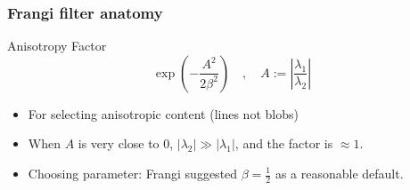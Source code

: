 \documentclass[9pt]{beamer}
\begin{document}
\begin{frame}
\frametitle[Anisotropy Factor]{Frangi filter anatomy}
\begin{block}{Anisotropy Factor}
\begin{equation}
\exp\left(-\frac{A^2}{2\beta^2}\right) \quad,\quad
A := \left|\frac{\lambda_1}{\lambda_2}\right|
\end{equation}
\end{block}
\begin{itemize}
  \item For selecting anisotropic content (lines not blobs)
  \item When $A$ is very close to 0,
  $\left|\lambda_2\right| \gg \left|\lambda_1\right|$, and the factor is $\approx 1$.
  \item Choosing parameter: Frangi suggested $\beta=\frac{1}{2}$ as a reasonable default.
\end{itemize}
\begin{figure} \centering
\end{figure}
\end{frame}
\end{document}
